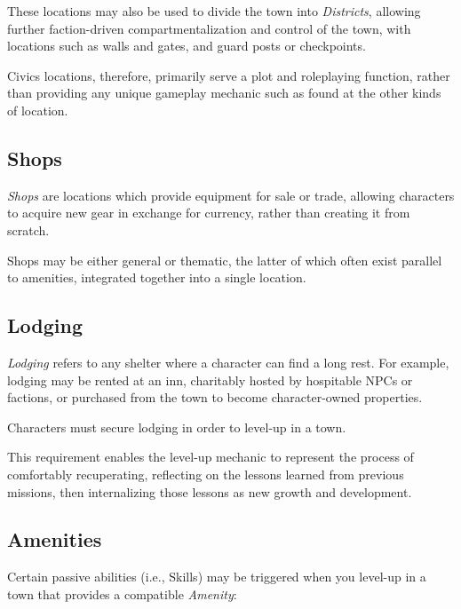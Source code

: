 \vspace{0.4em}

These locations may also be used to divide the town into \textit{Districts}, 
allowing further faction-driven compartmentalization and control of the town,
with locations such as walls and gates, and guard posts or checkpoints.

\vspace{0.4em}

Civics locations, therefore, primarily serve a plot and roleplaying function, 
rather than providing any unique gameplay mechanic such as found at the other kinds of location.


\subsection{Shops}
\textit{Shops} are locations which provide equipment for sale or trade, 
allowing characters to acquire new gear in exchange for currency, 
rather than creating it from scratch.

\vspace{0.4em}

Shops may be either general or thematic, the latter of which often exist parallel to amenities, 
integrated together into a single location.


\subsection{Lodging}
\textit{Lodging} refers to any shelter where a character can find a long rest.
For example, lodging may be rented at an inn, charitably hosted by hospitable NPCs or factions, 
or purchased from the town to become character-owned properties.

\vspace{0.4em}

Characters must secure lodging in order to level-up in a town. 

\begin{DesignerNote}
This requirement enables the level-up mechanic to represent the process of comfortably recuperating, 
reflecting on the lessons learned from previous missions, then internalizing those lessons as new growth and development.
\end{DesignerNote}


\subsection{Amenities}
Certain passive abilities (i.e., Skills) may be triggered when you 
level-up in a town that provides a compatible \textit{Amenity}:

